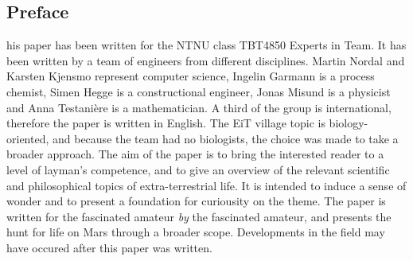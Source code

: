 \subsection{Preface}
his paper has been written for the NTNU class TBT4850 Experts in Team.
It has been written by a team of engineers from different disciplines.
Martin Nordal and Karsten Kjensmo represent computer science, Ingelin Garmann is a process chemist, Simen Hegge is a constructional engineer, Jonas Misund is a physicist and Anna Testani\`{e}re is a mathematician.
A third of the group is international, therefore the paper is written in English. 
The EiT village topic is biology-oriented, and because the team had no biologists, the choice was made to take a broader approach. 
The aim of the paper is to bring the interested reader to a level of layman's competence, and to give an overview of the relevant scientific and philosophical topics of extra-terrestrial life.
It is intended to induce a sense of wonder and to present a foundation for curiousity on the theme. 
The paper is written for the fascinated amateur \emph{by} the fascinated amateur, and presents the hunt for life on Mars through a broader scope. Developments in the field may have occured after this paper was written. 
 